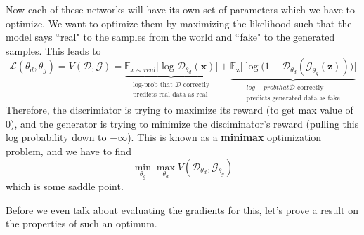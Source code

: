 \documentclass{article}
\begin{document}
  \begin{definition}
    \label{def:gan-loss}
    Now each of these networks will have its own set of parameters which we have to optimize. We want to optimize them by maximizing the likelihood such that the model says ``real" to the samples from the world and ``fake" to the generated samples. This leads to 
    \begin{equation}
      \mathcal{L}(\theta_d, \theta_g) = V(\mathcal{D}, \mathcal{G}) = \underbrace{\mathbb{E}_{x \sim real} \big[ \log \mathcal{D}_{\theta_d}(\mathbf{x}) \big]}_{\substack{\text{log-prob that } \mathcal{D} \text{ correctly} \\ \text{predicts real data as real}}} + \underbrace{\mathbb{E}_{\mathbf{z}} \big[ \log \big( 1 - \mathcal{D}_{\theta_d} ( \mathcal{G}_{\theta_g} (\mathbf{z}))\big)\big]}_{\substack{{log-prob that } \mathcal{D} \text{ correctly} \\ \text{predicts generated data as fake} }}
    \end{equation}
    Therefore, the discrimiator is trying to maximize its reward (to get max value of $0$), and the generator is trying to minimize the disciminator's reward (pulling this log probability down to $-\infty$). This is known as a \textbf{minimax} optimization problem, and we have to find 
    \begin{equation}
      \min_{\theta_g} \max_{\theta_d} V(\mathcal{D}_{\theta_d}, \mathcal{G}_{\theta_g})
    \end{equation}
    which is some saddle point. 
  \end{definition}

  Before we even talk about evaluating the gradients for this, let's prove a result on the properties of such an optimum.   
\end{document}
